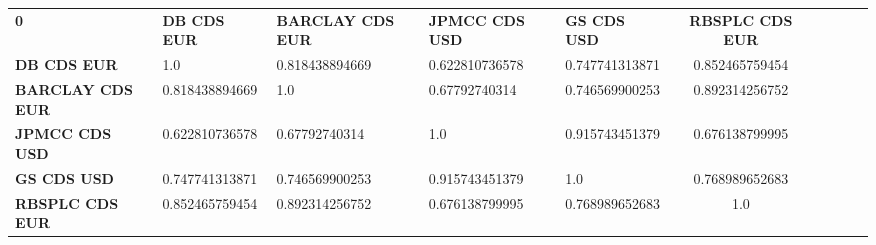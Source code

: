 \begin{center}
 \begin{tabular}{|l|l|l|l|l|c|c|c|c|c|}
\hline
\textbf{0} & \textbf{DB CDS EUR} & \textbf{BARCLAY CDS EUR} & \textbf{JPMCC CDS USD} & \textbf{GS CDS USD} & \textbf{RBSPLC CDS EUR}\\\hhline{|=|=|=|=|=|=|}
\textbf{DB CDS EUR} & 1.0 & 0.818438894669 & 0.622810736578 & 0.747741313871 & 0.852465759454\\
\textbf{BARCLAY CDS EUR} & 0.818438894669 & 1.0 & 0.67792740314 & 0.746569900253 & 0.892314256752\\
\textbf{JPMCC CDS USD} & 0.622810736578 & 0.67792740314 & 1.0 & 0.915743451379 & 0.676138799995\\
\textbf{GS CDS USD} & 0.747741313871 & 0.746569900253 & 0.915743451379 & 1.0 & 0.768989652683\\
\textbf{RBSPLC CDS EUR} & 0.852465759454 & 0.892314256752 & 0.676138799995 & 0.768989652683 & 1.0\\
\hline
\end{tabular}
\end{center}